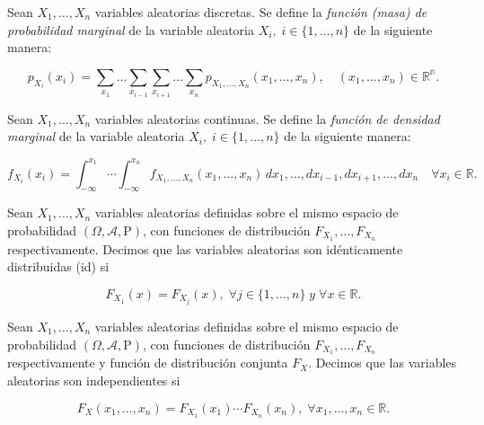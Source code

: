 \begin{definicion}
    Sean $X_1, \ldots, X_n$ variables aleatorias discretas. Se define la \emph{función (masa) de probabilidad marginal} de la variable aleatoria $X_i, \; i \in \{1, \ldots, n\}$ de la siguiente manera:

    \[ p_{X_i}(x_i) = \sum_{x_1}\ldots\sum_{x_{i-1}}\sum_{x_{i+1}}\ldots\sum_{x_{n}} p_{X_1, \ldots, X_n}(x_1, \ldots, x_n), \quad (x_1, \ldots, x_n) \in \mathbb{R^n}. \]\newline
\end{definicion}

\begin{definicion}
    Sean $X_1, \ldots, X_n$ variables aleatorias continuas. Se define la \emph{función de densidad marginal} de la variable aleatoria $X_i, \; i \in \{1, \ldots, n\}$ de la siguiente manera:

    \[ f_{X_i}(x_i) = \int_{-\infty}^{x_1} \cdots \int_{-\infty}^{x_n} f_{X_{1}, \ldots, X_n} (x_1, \ldots, x_n)\, dx_1, \ldots, dx_{i-1},dx_{i+1}, \ldots,  dx_n \! \! \quad \forall x_i \in \mathbb{R}. \]\newline
\end{definicion}

\begin{definicion}\label{def:variables-aleatorias-idénticamente-distribuidas}
    Sean $X_1, \ldots, X_n$ variables aleatorias definidas sobre el mismo espacio de probabilidad $(\Omega, \mathcal{A}, \mathrm{P})$, con funciones de distribución $F_{X_1}, \ldots, F_{X_n}$ respectivamente. Decimos que las variables aleatorias son idénticamente distribuidas (id) si

    \[ F_{X_1}(x) = F_{X_j}(x), \; \forall j \in \{1, \ldots, n \} \; y \; \forall x \in \mathbb{R}. \]\newline
\end{definicion}

\begin{definicion}\label{def:variables-aleatorias-independientes}
    Sean $X_1, \ldots, X_n$ variables aleatorias definidas sobre el mismo espacio de probabilidad $(\Omega, \mathcal{A}, \mathrm{P})$, con funciones de distribución $F_{X_1}, \ldots, F_{X_n}$ respectivamente y función de distribución conjunta $F_{X}$. Decimos que las variables aleatorias son independientes si

    \[ F_X(x_1, \ldots, x_n) = F_{X_1}(x_1) \cdots F_{X_n}(x_n), \; \forall x_1, \ldots, x_n \in \mathbb{R}. \]\newline
\end{definicion}


